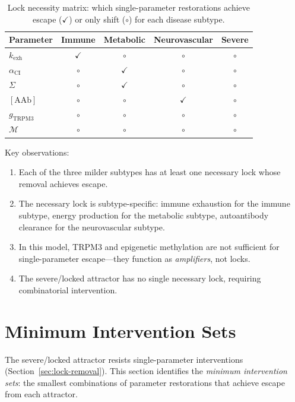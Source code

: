 \begin{table}[htbp]
\centering
\caption{Lock necessity matrix: which single-parameter restorations achieve escape ($\checkmark$) or only shift ($\circ$) for each disease subtype.}
\label{tab:lock-necessity}
\begin{tabular}{lcccc}
\hline
Parameter & Immune & Metabolic & Neurovascular & Severe \\
\hline
$k_{\text{exh}}$ & $\checkmark$ & $\circ$ & $\circ$ & $\circ$ \\
$\alpha_{\text{CI}}$ & $\circ$ & $\checkmark$ & $\circ$ & $\circ$ \\
$\Sigma$ & $\circ$ & $\checkmark$ & $\circ$ & $\circ$ \\
$[\text{AAb}]$ & $\circ$ & $\circ$ & $\checkmark$ & $\circ$ \\
$g_{\text{TRPM3}}$ & $\circ$ & $\circ$ & $\circ$ & $\circ$ \\
$\mathcal{M}$ & $\circ$ & $\circ$ & $\circ$ & $\circ$ \\
\hline
\end{tabular}
\end{table}

Key observations:
\begin{enumerate}
    \item Each of the three milder subtypes has at least one necessary lock whose removal achieves escape.
    \item The necessary lock is subtype-specific: immune exhaustion for the immune subtype, energy production for the metabolic subtype, autoantibody clearance for the neurovascular subtype.
    \item In this model, TRPM3 and epigenetic methylation are not sufficient for single-parameter escape---they function as \emph{amplifiers}, not locks.
    \item The severe/locked attractor has no single necessary lock, requiring combinatorial intervention.
\end{enumerate}

\section{Minimum Intervention Sets}
\label{sec:minimum-intervention-sets}

The severe/locked attractor resists single-parameter interventions (Section~\ref{sec:lock-removal}). This section identifies the \emph{minimum intervention sets}: the smallest combinations of parameter restorations that achieve escape from each attractor.

